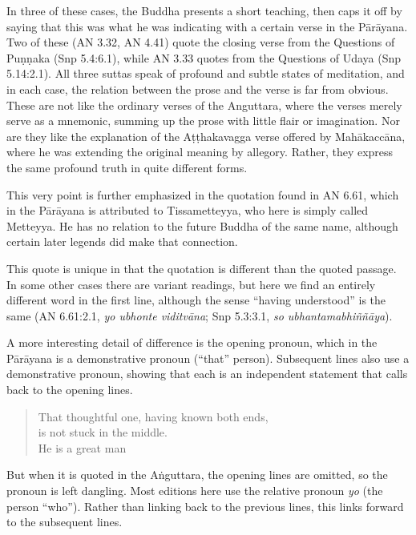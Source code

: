\documentclass[12pt,openany]{book}%
\begin{document}
In three of these cases, the Buddha presents a short teaching, then caps it off by saying that this was what he was indicating with a certain verse in the \textsanskrit{Pārāyana}. Two of these (AN 3.32, AN 4.41) quote the closing verse from the Questions of \textsanskrit{Puṇṇaka} (Snp 5.4:6.1), while AN 3.33 quotes from the Questions of Udaya (Snp 5.14:2.1). All three suttas speak of profound and subtle states of meditation, and in each case, the relation between the prose and the verse is far from obvious. These are not like the ordinary verses of the Anguttara, where the verses merely serve as a mnemonic, summing up the prose with little flair or imagination. Nor are they like the explanation of the \textsanskrit{Aṭṭhakavagga} verse offered by \textsanskrit{Mahākaccāna}, where he was extending the original meaning by allegory. Rather, they express the same profound truth in quite different forms.

This very point is further emphasized in the quotation found in AN 6.61, which in the \textsanskrit{Pārāyana} is attributed to Tissametteyya, who here is simply called Metteyya. He has no relation to the future Buddha of the same name, although certain later legends did make that connection.

This quote is unique in that the quotation is different than the quoted passage. In some other cases there are variant readings, but here we find an entirely different word in the first line, although the sense “having understood” is the same (AN 6.61:2.1, \textit{yo ubhonte \textsanskrit{viditvāna}}; Snp 5.3:3.1, \textit{so \textsanskrit{ubhantamabhiññāya}}).

A more interesting detail of difference is the opening pronoun, which in the \textsanskrit{Pārāyana} is a demonstrative pronoun (“that” person). Subsequent lines also use a demonstrative pronoun, showing that each is an independent statement that calls back to the opening lines.

\begin{verse}%
That thoughtful one, having known both ends, \\
is not stuck in the middle. \\
He is a great man

%
\end{verse}

But when it is quoted in the \textsanskrit{Aṅguttara}, the opening lines are omitted, so the pronoun is left dangling. Most editions here use the relative pronoun \textit{yo} (the person “who”). Rather than linking back to the previous lines, this links forward to the subsequent lines.
\end{document}
